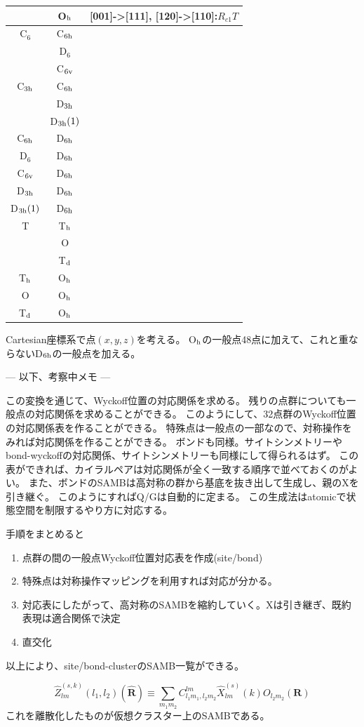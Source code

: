 \documentclass[11pt]{easymemo}
\begin{document}
\begin{table}[t]
\begin{center}
\begin{tabular}{ccc}
      & O$_{\rm h}$ & [001]->[111], [120]->[110]:$R_{c1}T$ \\ \hline\hline
C$_6$ & C$_{\rm 6h}$ & \\
   & D$_6$ & \\
   & C$_{\rm 6v}$ & \\ \hline
C$_{\rm 3h}$ & C$_{\rm 6h}$ & \\
    & D$_{\rm 3h}$ & \\
    & D$_{\rm 3h}(1)$ & \\ \hline
C$_{\rm 6h}$ & D$_{\rm 6h}$ & \\ \hline
D$_6$ & D$_{\rm 6h}$ & \\ \hline
C$_{\rm 6v}$ & D$_{\rm 6h}$ & \\ \hline
D$_{\rm 3h}$ & D$_{\rm 6h}$ & \\ \hline
D$_{\rm 3h}(1)$ & D$_{\rm 6h}$ & \\ \hline\hline
T & T$_{\rm h}$ & \\
  & O & \\
  & T$_{\rm d}$ & \\ \hline
T$_{\rm h}$ & O$_{\rm h}$ & \\ \hline
O & O$_{\rm h}$ & \\ \hline
T$_{\rm d}$ & O$_{\rm h}$ & \\ \hline\hline
\end{tabular}
\end{center}
\end{table}

Cartesian座標系で点$(x,y,z)$を考える。
O$_{\rm h}$の一般点48点に加えて、これと重ならないD$_{\rm 6h}$の一般点を加える。


--- 以下、考察中メモ ---

この変換を通じて、Wyckoff位置の対応関係を求める。
残りの点群についても一般点の対応関係を求めることができる。
このようにして、32点群のWyckoff位置の対応関係表を作ることができる。
特殊点は一般点の一部なので、対称操作をみれば対応関係を作ることができる。
ボンドも同様。サイトシンメトリーやbond-wyckoffの対応関係、サイトシンメトリーも同様にして得られるはず。
この表ができれば、カイラルペアは対応関係が全く一致する順序で並べておくのがよい。
また、ボンドのSAMBは高対称の群から基底を抜き出して生成し、親のXを引き継ぐ。
このようにすればQ/Gは自動的に定まる。
この生成法はatomicで状態空間を制限するやり方に対応する。

手順をまとめると
\begin{enumerate}
\item 点群の間の一般点Wyckoff位置対応表を作成(site/bond)
\item 特殊点は対称操作マッピングを利用すれば対応が分かる。
\item 対応表にしたがって、高対称のSAMBを縮約していく。Xは引き継ぎ、既約表現は適合関係で決定
\item 直交化
\end{enumerate}
以上により、site/bond-clusterのSAMB一覧ができる。

\[
\hat{Z}_{lm}^{(s,k)}(l_1,l_2)(\hat{\bm{R}})
\equiv\sum_{m_1m_2}C_{l_1m_1,l_2m_2}^{lm}\hat{X}_{lm}^{(s)}(k)O_{l_2m_2}(\bm{R})
\]
これを離散化したものが仮想クラスター上のSAMBである。
\end{document}
